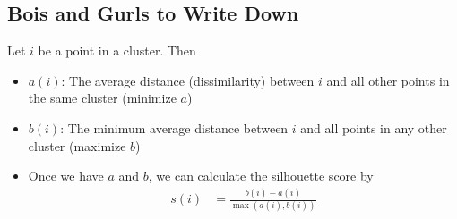 \documentclass[10pt]{report}
\begin{document}
\subsection{Bois and Gurls to Write Down}
Let $i$ be a point in a cluster. Then
\begin{itemize}
  \item $a(i)$: The average distance (dissimilarity) between $i$ and all other points in the same cluster (minimize $a$)
  \item $b(i)$: The minimum average distance between $i$ and all points in any other cluster (maximize $b$)
  \item Once we have $a$ and $b$, we can calculate the silhouette score by
    \begin{align*}
      s(i) &= \frac{b(i) - a(i)}{\max(a(i), b(i))}
    \end{align*}
\end{itemize}
\end{document}
